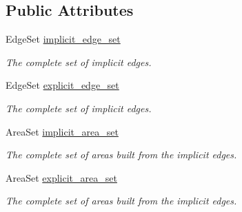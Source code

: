 \subsection*{Public Attributes}
\begin{DoxyCompactItemize}
\item 
Edge\+Set \hyperlink{classcvdi_1_1AreaFitter_a362bc13dadb5e7ff3151bbf8d0fe735c}{implicit\+\_\+edge\+\_\+set}\hypertarget{classcvdi_1_1AreaFitter_a362bc13dadb5e7ff3151bbf8d0fe735c}{}\label{classcvdi_1_1AreaFitter_a362bc13dadb5e7ff3151bbf8d0fe735c}

\begin{DoxyCompactList}\small\item\em The complete set of implicit edges. \end{DoxyCompactList}\item 
Edge\+Set \hyperlink{classcvdi_1_1AreaFitter_a60a8f1de63afe94f368a06382a035acb}{explicit\+\_\+edge\+\_\+set}\hypertarget{classcvdi_1_1AreaFitter_a60a8f1de63afe94f368a06382a035acb}{}\label{classcvdi_1_1AreaFitter_a60a8f1de63afe94f368a06382a035acb}

\begin{DoxyCompactList}\small\item\em The complete set of implicit edges. \end{DoxyCompactList}\item 
Area\+Set \hyperlink{classcvdi_1_1AreaFitter_a51b64f5f4d531e6ca4bc03b554f77c7e}{implicit\+\_\+area\+\_\+set}\hypertarget{classcvdi_1_1AreaFitter_a51b64f5f4d531e6ca4bc03b554f77c7e}{}\label{classcvdi_1_1AreaFitter_a51b64f5f4d531e6ca4bc03b554f77c7e}

\begin{DoxyCompactList}\small\item\em The complete set of areas built from the implicit edges. \end{DoxyCompactList}\item 
Area\+Set \hyperlink{classcvdi_1_1AreaFitter_afaca52e1741b02ba88960cb3b837b8f4}{explicit\+\_\+area\+\_\+set}\hypertarget{classcvdi_1_1AreaFitter_afaca52e1741b02ba88960cb3b837b8f4}{}\label{classcvdi_1_1AreaFitter_afaca52e1741b02ba88960cb3b837b8f4}

\begin{DoxyCompactList}\small\item\em The complete set of areas built from the implicit edges. \end{DoxyCompactList}\end{DoxyCompactItemize}


